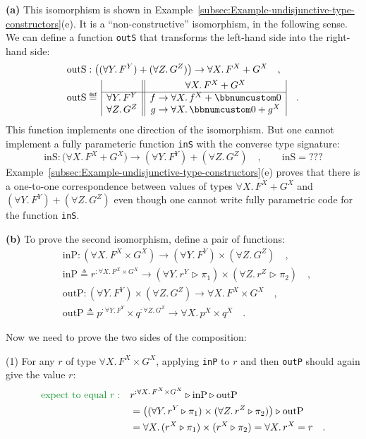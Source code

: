 \textbf{(a)} This isomorphism is shown in Example~\ref{subsec:Example-undisjunctive-type-constructors}(e).
It is a \textsf{``}non-constructive\textsf{''} isomorphism, in the following sense.
We can define a function \lstinline!outS! that transforms the left-hand
side into the right-hand side:
\begin{align*}
 & \text{outS}:\big((\forall Y.\,F^{Y})+(\forall Z.\,G^{Z})\big)\rightarrow\forall X.\,F^{X}+G^{X}\quad,\\
 & \text{outS}\triangleq\,\begin{array}{|c||c|}
 & \forall X.\,F^{X}+G^{X}\\
\hline \forall Y.\,F^{Y} & f\rightarrow\forall X.\,f^{X}+\bbnum 0\\
\forall Z.\,G^{Z} & g\rightarrow\forall X.\,\bbnum 0+g^{X}
\end{array}\quad.
\end{align*}
This function implements one direction of the isomorphism. But one
cannot implement a fully parameteric function \lstinline!inS! with
the converse type signature:
\[
\text{inS}:\big(\forall X.\,F^{X}+G^{X}\big)\rightarrow(\forall Y.\,F^{Y})+(\forall Z.\,G^{Z})\quad,\quad\quad\text{inS}=???
\]
Example~\ref{subsec:Example-undisjunctive-type-constructors}(e)
proves that there is a one-to-one correspondence between values of
types $\forall X.\,F^{X}+G^{X}$ and $(\forall Y.\,F^{Y})+(\forall Z.\,G^{Z})$
even though one cannot write fully parametric code for the function
\lstinline!inS!.

\textbf{(b)} To prove the second isomorphism, define a pair of functions:
\begin{align*}
 & \text{inP}:(\forall X.\,F^{X}\times G^{X})\rightarrow(\forall Y.\,F^{Y})\times(\forall Z.\,G^{Z})\quad,\\
 & \text{inP}\triangleq r^{:\forall X.\,F^{X}\times G^{X}}\rightarrow(\forall Y.\,r^{Y}\triangleright\pi_{1})\times(\forall Z.\,r^{Z}\triangleright\pi_{2})\quad,\\
 & \text{outP}:(\forall Y.\,F^{Y})\times(\forall Z.\,G^{Z})\rightarrow\forall X.\,F^{X}\times G^{X}\quad,\\
 & \text{outP}\triangleq p^{:\forall Y.\,F^{Y}}\times q^{:\forall Z.\,G^{Z}}\rightarrow\forall X.\,p^{X}\times q^{X}\quad.
\end{align*}

Now we need to prove the two sides of the composition:

(1) For any $r$ of type $\forall X.\,F^{X}\times G^{X}$, applying
\lstinline!inP! to $r$ and then \lstinline!outP! should again give
the value $r$:
\begin{align*}
{\color{greenunder}\text{expect to equal }r:}\quad & r^{:\forall X.\,F^{X}\times G^{X}}\triangleright\text{inP}\triangleright\text{outP}\\
 & =\big((\forall Y.\,r^{Y}\triangleright\pi_{1})\times(\forall Z.\,r^{Z}\triangleright\pi_{2})\big)\triangleright\text{outP}\\
 & =\forall X.\,(r^{X}\triangleright\pi_{1})\times(r^{X}\triangleright\pi_{2})=\forall X.\,r^{X}=r\quad.
\end{align*}

